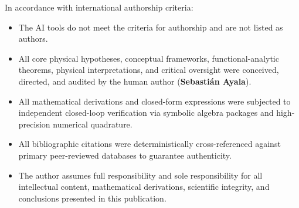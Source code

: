 \documentclass{optica-article}
\begin{document}
\begin{backmatter}
In accordance with international authorship criteria:
\begin{itemize}
    \item The AI tools do not meet the criteria for authorship and are not listed as authors.
    \item All core physical hypotheses, conceptual frameworks, functional-analytic theorems, physical interpretations, and critical oversight were conceived, directed, and audited by the human author (\textbf{Sebastián Ayala}).
    \item All mathematical derivations and closed-form expressions were subjected to independent closed-loop verification via symbolic algebra packages and high-precision numerical quadrature.
    \item All bibliographic citations were deterministically cross-referenced against primary peer-reviewed databases to guarantee authenticity.
    \item The author assumes full responsibility and sole responsibility for all intellectual content, mathematical derivations, scientific integrity, and conclusions presented in this publication.
\end{itemize}
\end{backmatter}


\end{document}
